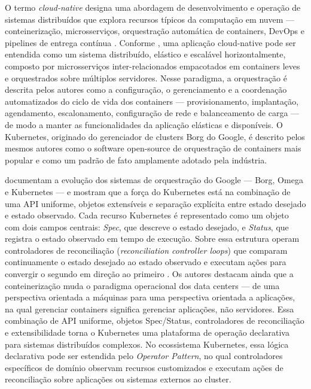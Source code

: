 O termo \textit{cloud-native} designa uma abordagem de desenvolvimento e operação de sistemas distribuídos que explora recursos típicos da computação em nuvem --- conteinerização, microsserviços, orquestração automática de containers, DevOps e pipelines de entrega contínua \cite{Shuiguang2023}. Conforme , uma aplicação cloud-native pode ser entendida como um sistema distribuído, elástico e escalável horizontalmente, composto por microsserviços inter-relacionados empacotados em containers leves e orquestrados sobre múltiplos servidores. Nesse paradigma, a orquestração é descrita pelos autores como a configuração, o gerenciamento e a coordenação automatizados do ciclo de vida dos containers --- provisionamento, implantação, agendamento, escalonamento, configuração de rede e balanceamento de carga --- de modo a manter as funcionalidades da aplicação elásticas e disponíveis. O Kubernetes, originado do gerenciador de clusters Borg do Google, é descrito pelos mesmos autores como o software open-source de orquestração de containers mais popular e como um padrão de fato amplamente adotado pela indústria.

 documentam a evolução dos sistemas de orquestração do Google --- Borg, Omega e Kubernetes --- e mostram que a força do Kubernetes está na combinação de uma API uniforme, objetos extensíveis e separação explícita entre estado desejado e estado observado. Cada recurso Kubernetes é representado como um objeto com dois campos centrais: \textit{Spec}, que descreve o estado desejado, e \textit{Status}, que registra o estado observado em tempo de execução. Sobre essa estrutura operam controladores de reconciliação (\textit{reconciliation controller loops}) que comparam continuamente o estado desejado ao estado observado e executam ações para convergir o segundo em direção ao primeiro \cite{Burns2016}. Os autores destacam ainda que a conteinerização muda o paradigma operacional dos data centers --- de uma perspectiva orientada a máquinas para uma perspectiva orientada a aplicações, na qual gerenciar containers significa gerenciar aplicações, não servidores. Essa combinação de API uniforme, objetos Spec/Status, controladores de reconciliação e extensibilidade torna o Kubernetes uma plataforma de operação declarativa para sistemas distribuídos complexos. No ecossistema Kubernetes, essa lógica declarativa pode ser estendida pelo \textit{Operator Pattern}, no qual controladores específicos de domínio observam recursos customizados e executam ações de reconciliação sobre aplicações ou sistemas externos ao cluster.


